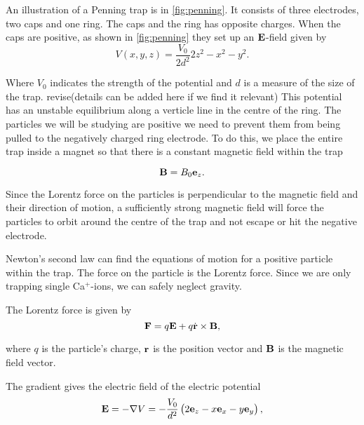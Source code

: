 An illustration of a Penning trap is in \autoref{fig:penning}. It
consists of three electrodes, two caps and one ring.
The caps and the ring has opposite charges. When the caps are positive, as shown in \autoref{fig:penning}
they set up an $\bold{E}$-field given by
\begin{equation}
V(x, y, z) = \frac{V_0}{2d^2}{2z^2 - x^2 - y^2}.
\end{equation}

Where $V_0$ indicates the strength of the potential and $d$ is a measure of the size of the trap.
revise(details can be added here if we find it relevant)
This potential has an unstable equilibrium along a verticle line in the centre of the ring.
The particles we will be studying are positive we need to prevent them from being pulled to the negatively
charged ring electrode. To do this, we place the entire trap inside a magnet so that there is a constant
magnetic field within the trap

\begin{equation}
\bold{B} = B_0 \bold{e}_z.
\end{equation}

Since the Lorentz force on the particles is perpendicular to the magnetic field and their direction of
motion, a sufficiently strong magnetic field will force the particles to orbit around the centre of the trap
and not escape or hit the negative electrode.

Newton's second law can find the equations of motion for a positive particle within the trap. The
force on the particle is the Lorentz force. Since we are only trapping
single Ca$^+$-ions, we can safely neglect gravity.

The Lorentz force is given by
\begin{equation}
\bold{F} = q\bold{E} + q\dot{\bold{r}} \times \bold{B},
\end{equation}

where $q$ is the particle's charge, $\bold{r}$ is the position vector and $\bold{B}$ is the magnetic field vector.

The gradient gives the electric field
of the electric potential
\begin{equation}
\bold{E} = -\nabla V = -\frac{V_0}{d^2}\left(2 \bold{e}_z - x\bold{e}_x - y\bold{e}_y\right),
\end{equation}

